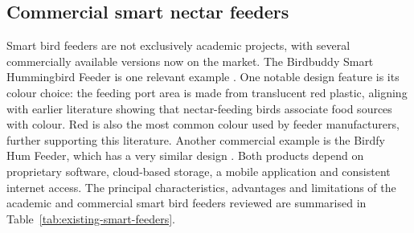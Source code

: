 \subsection{Commercial smart nectar feeders}
Smart bird feeders are not exclusively academic projects, with several commercially available versions now on the market. The Birdbuddy Smart Hummingbird Feeder is one relevant example \cite{BirdBuddyHummingbirdFeeder}. One notable design feature is its colour choice: the feeding port area is made from translucent red plastic, aligning with earlier literature showing that nectar-feeding birds associate food sources with colour. Red is also the most common colour used by feeder manufacturers, further supporting this literature. Another commercial example is the Birdfy Hum Feeder, which has a very similar design \cite{BirdfyHumFeeder}. Both products depend on proprietary software, cloud-based storage, a mobile application and consistent internet access. The principal characteristics, advantages and limitations of the academic and commercial smart bird feeders reviewed are summarised in Table~\ref{tab:existing-smart-feeders}.

